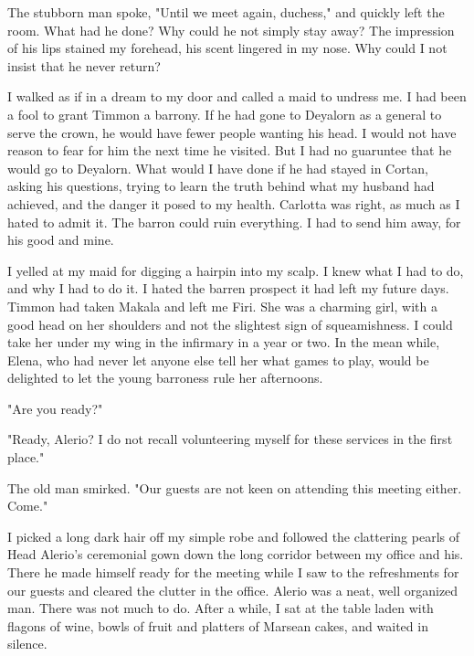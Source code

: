 \documentclass{article}
\begin{document}
The stubborn man spoke, "Until we meet again, duchess," and quickly left the room. What had he done? Why could he not simply stay away? The impression of his lips stained my forehead, his scent lingered in my nose. Why could I not insist that he never return?

I walked as if in a dream to my door and called a maid to undress me. I had been a fool to grant Timmon a barrony. If he had gone to Deyalorn as a general to serve the crown, he would have fewer people wanting his head. I would not have reason to fear for him the next time he visited. But I had no guaruntee that he would go to Deyalorn. What would I have done if he had stayed in Cortan, asking his questions, trying to learn the truth behind what my husband had achieved, and the danger it posed to my health. Carlotta was right, as much as I hated to admit it. The barron could ruin everything. I had to send him away, for his good and mine.

I yelled at my maid for digging a hairpin into my scalp. I knew what I had to do, and why I had to do it. I hated the barren prospect it had left my future days. Timmon had taken Makala and left me Firi. She was a charming girl, with a good head on her shoulders and not the slightest sign of squeamishness. I could take her under my wing in the infirmary in a year or two. In the mean while, Elena, who had never let anyone else tell her what games to play, would be delighted to let the young barroness rule her afternoons.

\vpsace{.5cm}

"Are you ready?"

"Ready, Alerio? I do not recall volunteering myself for these services in the first place."

The old man smirked. "Our guests are not keen on attending this meeting either. Come."

I picked a long dark hair off my simple robe and followed the clattering pearls of Head Alerio's ceremonial gown down the long corridor between my office and his. There he made himself ready for the meeting while I saw to the refreshments for our guests and cleared the clutter in the office. Alerio was a neat, well organized man. There was not much to do. After a while, I sat at the table laden with flagons of wine, bowls of fruit and platters of Marsean cakes, and waited in silence. 
\end{document}
